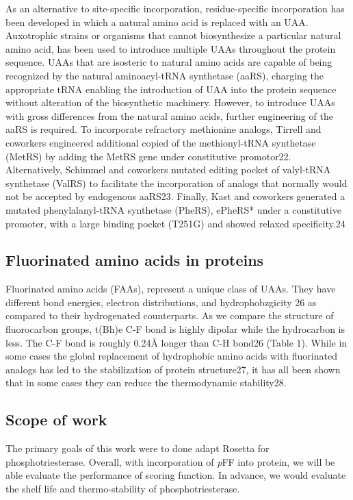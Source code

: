 \begin{refsection}
As an alternative to site-specific incorporation, residue-specific
incorporation has been developed in which a natural amino acid is replaced with
an UAA. Auxotrophic strains or organisms that cannot biosynthesize a particular
natural amino acid, has been used to introduce multiple UAAs throughout the
protein sequence. UAAs that are isosteric to natural amino acids are capable of
being recognized by the natural aminoacyl-tRNA synthetase (aaRS), charging the
appropriate tRNA enabling the introduction of UAA into the protein sequence
without alteration of the biosynthetic machinery. However, to introduce UAAs
with gross differences from the natural amino acids, further engineering of the
aaRS is required. To incorporate refractory methionine analogs, Tirrell and
coworkers engineered additional copied of the methionyl-tRNA synthetase (MetRS)
by adding the MetRS gene under constitutive promotor22. Alternatively, Schimmel
and coworkers mutated editing pocket of valyl-tRNA synthetase (ValRS) to
facilitate the incorporation of analogs that normally would not be accepted by
endogenous aaRS23. Finally, Kast and coworkers generated a mutated
phenylalanyl-tRNA synthetase (PheRS), ePheRS* under a constitutive promoter,
with a large binding pocket (T251G) and showed relaxed specificity.24

\subsection{Fluorinated amino acids in proteins} 
\label{sec:faa}

Fluorinated amino acids (FAAs), represent a unique class of UAAs. They have
different bond energies, electron distributions, and hydrophobzgicity 26 as
compared to their hydrogenated counterparts. As we compare the structure of
fluorocarbon groups, t(Bh)e C-F bond is highly dipolar while the hydrocarbon is
less. The C-F bond is roughly 0.24Å longer than C-H bond26 (Table 1). While in
some cases the global replacement of hydrophobic amino acids with fluorinated
analogs has led to the stabilization of protein structure27, it has all been
shown that in some cases they can reduce the thermodynamic stability28.

\subsection{Scope of work}

The primary goals of this work were to done adapt Rosetta for
phosphotriesterase. Overall, with incorporation of \emph{p}FF into protein, we
will be able evaluate the performance of scoring function. In advance, we would
evaluate the shelf life and thermo-stability of phosphotriesterase.


\end{refsection}
